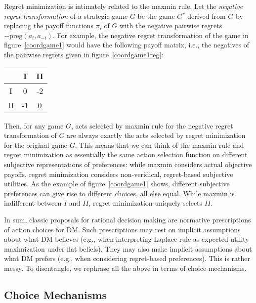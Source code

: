 \documentclass[fleqn,reqno,12pt]{article}
\theoremstyle{Satz}
\theoremstyle{Bsp}
\begin{document}

  

Regret minimization is intimately related to the maxmin rule. Let the \emph{negative regret
  transformation} of a strategic game $G$ be the game $G^r$ derived from $G$ by replacing the payoff
functions $\pi_i$ of $G$ with the negative pairwise regrets $-\text{preg}(a_i,a_{-i})$. For
example, the negative regret transformation of the game in figure~\ref{coordgame1} would have the
following payoff matrix, i.e., the negatives of the pairwise regrets given in
figure~\ref{coordgame1reg}:

\begin{center}
    \begin{tabular}{ccc}
      \toprule
      & I & II \\
      \midrule
      I & 0 & -2 \\
      II & -1 & 0\\
      \bottomrule
    \end{tabular}
\end{center}

\noindent Then, for any game $G$, acts selected by maxmin rule for the negative regret transformation of $G$ are
always exactly the acts selected by regret minimization for the original game $G$.
This means that we can think of the maxmin rule and regret minimization as essentially the same
action selection function on different subjective representations of preferences: while maxmin considers actual
objective payoffs, regret minimization considers non-veridical, regret-based subjective
utilities. As the example of figure~\ref{coordgame1} shows, different subjective preferences
can give rise to different choices, all else equal. While maxmin is indifferent
between $I$ and $II$, regret minimization uniquely selects $II$.

In sum, classic proposals for rational decision making are normative prescriptions of action choices
for DM. Such prescriptions may rest on implicit assumptions about what DM
believes (e.g., when interpreting Laplace rule as expected utility maximization under flat beliefs). They may
also make implicit assumptions about what DM prefers (e.g., when considering regret-based preferences). This is rather messy. To disentangle, we rephrase all the above in terms of choice mechanisms.

\subsection{Choice Mechanisms}
\label{sec:choice-mechanisms}
\end{document}
